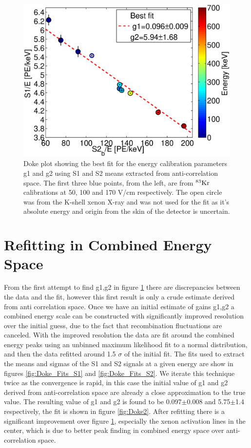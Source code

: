  \begin{figure}[h!]\centering
\includegraphics[width=120mm]{Chapter_E_Scale/Figures/S1S2_Doke_1.eps}
\caption{Doke plot showing the best fit for the energy calibration parameters g1 and g2 using S1 and S2 means extracted from anti-correlation space. The first three blue points, from the left, are from $\rm^{83}Kr$ calibrations at 50, 100 and 170 V/cm respectively. The open circle was from the K-shell xenon X-ray and was not used for the fit as it's absolute energy and origin from the skin of the detector is uncertain.}
\label{fig:Doke1}
\end{figure}

\section{Refitting in Combined Energy Space}
From the first attempt to find g1,g2 in figure \ref{fig:Doke1} there are discrepancies between the data and the fit, however this first result is only a crude estimate derived from anti correlation space. Once we have an initial estimate of gains g1,g2 a combined energy scale can be constructed with significantly improved resolution over the initial guess, due to the fact that recombination fluctuations are canceled. With the improved resolution the data are fit around the combined energy peaks using an unbinned maximum likelihood fit to a normal distribution, and then the data refitted around 1.5 $\sigma$ of the initial fit. The fits used to extract the means and sigmas  of the S1 and S2 signals at a given energy are show in figures \ref{fig:Doke_Fits_S1} and \ref{fig:Doke_Fits_S2}. We iterate this technique twice as the convergence is rapid, in this case the initial value of g1 and g2 derived from anti-correlation space are already a close approximation to the true value. The resulting value of g1 and g2 is found to be 0.097$\pm$0.008 and 5.75$\pm$1.4 respectively, the fit is shown in figure \ref{fig:Doke2}. After refitting there is a significant improvement over figure \ref{fig:Doke1}, especially the xenon activation lines in the center, which is due to better peak finding in combined energy space over anti-correlation space.


